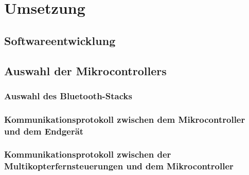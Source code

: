 
\chapter{Umsetzung}

\section{Softwareentwicklung}

\section{Auswahl der Mikrocontrollers}

\subsection{Auswahl des Bluetooth-Stacks}

\subsection{Kommunikationsprotokoll zwischen dem Mikrocontroller und dem Endgerät}
\subsection{Kommunikationsprotokoll zwischen der Multikopterfernsteuerungen und dem Mikrocontroller}
